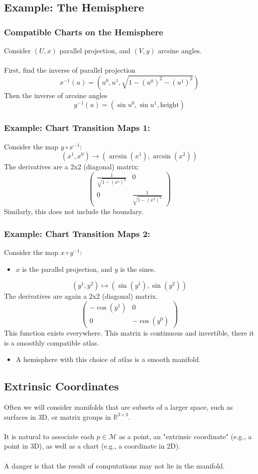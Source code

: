 \documentclass[10pt]{article}
\newcommand{\R}{\mathbb{R}}
\begin{document}
\subsection*{Example: The Hemisphere}
\subsubsection*{Compatible Charts on the Hemisphere}
Consider $(U, x)$ parallel projection, and $(V, y)$ arcsine angles.\\\\
First, find the inverse of parallel projection
\[x^{-1}(u) = (u^0, u^1, \sqrt{1 - (u^0)^2 - (u^1)^2})\]
Then the inverse of arcsine angles
\[y^{-1}(u) = (\sin u^0, \sin u^1, \text{height})\]

\subsubsection*{Example: Chart Transition Maps 1:}
Consider the map $y \circ x^{-1}$:
\[(x^1, x^0) \rightarrow (\arcsin(x^1), \arcsin(x^2))\]
The derivatives are a 2x2 (diagonal) matrix:
\[\begin{pmatrix}\frac{1}{\sqrt{1 - (x^1)^2}} & 0 \\ 0 & \frac{1}{\sqrt{1 - (x^2)^2}}\end{pmatrix}\]
Similarly, this does not include the boundary.

\subsubsection*{Example: Chart Transition Maps 2:}
Consider the map $x \circ y^{-1}$:
\begin{itemize}
    \item $x$ is the parallel projection, and $y$ is the sines.
\end{itemize}
\[(y^1, y^2) \mapsto (\sin(y^1), \sin(y^2))\]
The derivatives are again a 2x2 (diagonal) matrix.
\[\begin{pmatrix}
-\cos(y^1) & 0 \\ 0 & -\cos(y^0)
\end{pmatrix}\]
This function exists everywhere.  This matrix is continuous and invertible, there it is a smoothly compatible atlas.
\begin{itemize}
    \item A hemisphere with this choice of atlas is a smooth manifold.
\end{itemize}

\subsection*{Extrinsic Coordinates}
Often we will consider manifolds that are subsets of a larger space, such as surfaces in 3D, or matrix groups in $\R^{3\times 3}$.\\\\
It is natural to associate each $p \in \mathcal{M}$ as a point, an "extrinsic coordinate" (e.g., a point in 3D), as well as a chart (e.g., a coordinate in 2D).\\\\
A danger is that the result of computations may not lie in the manifold.
\end{document}
